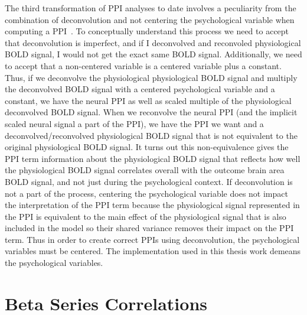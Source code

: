 \documentclass[phd,appendix,figures]{uithesis}
\begin{document}
The third transformation of PPI analyses to date involves a peculiarity from the combination of
deconvolution and not centering the psychological variable when computing a PPI~\cite{Di2017}.
To conceptually understand this process we need to accept that deconvolution is imperfect, and if I
deconvolved and reconvoled physiological BOLD signal, I would not get the exact same BOLD signal.
Additionally, we need to accept that a non-centered variable is a centered variable plus a constant.
Thus, if we deconvolve the physiological physiological BOLD signal and multiply the deconvolved
BOLD signal with a centered psychological variable and a constant, we have the neural PPI
as well as scaled multiple of the physiological deconvolved BOLD signal.
When we reconvolve the neural PPI (and the implicit scaled neural signal a part of the PPI),
we have the PPI we want and a deconvolved/reconvolved physiological BOLD signal that is not equivalent to the
original physiological BOLD signal.
It turns out this non-equivalence gives the PPI term information about the physiological BOLD signal that
reflects how well the physiological BOLD signal correlates overall with the outcome brain area BOLD signal, and not just
during the psychological context.
If deconvolution is not a part of the process, centering the psychological variable does not impact the interpretation
of the PPI term because the physiological signal represented in the PPI is equivalent to the main effect of the physiological
signal that is also included in the model so their shared variance removes their impact on the PPI term.
Thus in order to create correct PPIs using deconvolution, the psychological variables must be centered.
The implementation used in this thesis work demeans the psychological variables.

\section{Beta Series Correlations}
\end{document}
